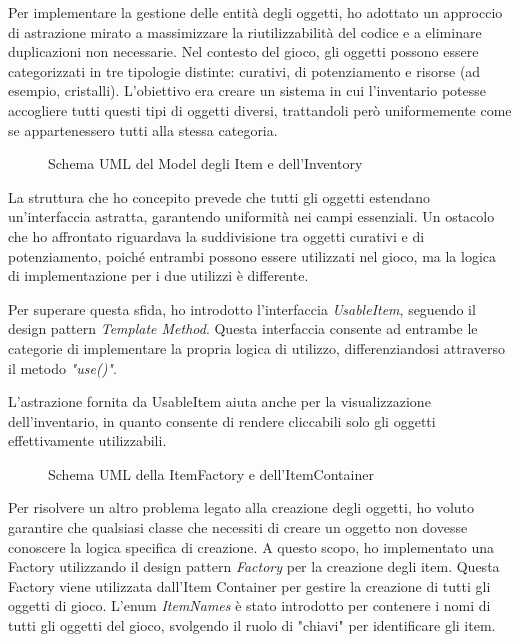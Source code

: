 \documentclass[a4paper,12pt]{report}
\begin{document}
Per implementare la gestione delle entità degli oggetti, ho adottato un approccio di astrazione mirato a massimizzare la riutilizzabilità del codice e a eliminare duplicazioni non necessarie. Nel contesto del gioco, gli oggetti possono essere categorizzati in tre tipologie distinte: curativi, di potenziamento e risorse (ad esempio, cristalli).
L'obiettivo era creare un sistema in cui l'inventario potesse accogliere tutti questi tipi di oggetti diversi, trattandoli però uniformemente come se appartenessero tutti alla stessa categoria.
\begin{figure}[H]
	\centering
	
	\caption{Schema UML del Model degli Item e dell'Inventory}
	\label{fig:the-exiled-item-uml}
\end{figure}

La struttura che ho concepito prevede che tutti gli oggetti estendano un'interfaccia astratta, garantendo uniformità nei campi essenziali. Un ostacolo che ho affrontato riguardava la suddivisione tra oggetti curativi e di potenziamento, poiché entrambi possono essere utilizzati nel gioco, ma la logica di implementazione per i due utilizzi è differente.

Per superare questa sfida, ho introdotto l'interfaccia \textit{UsableItem}, seguendo il design pattern \textit{Template Method}. Questa interfaccia consente ad entrambe le categorie di implementare la propria logica di utilizzo, differenziandosi attraverso il metodo \textit{"use()"}.

L'astrazione fornita da UsableItem aiuta anche per la visualizzazione dell'inventario, in quanto consente di rendere cliccabili solo gli oggetti effettivamente utilizzabili.

\begin{figure}[H]
	\centering
	
	\caption{Schema UML della ItemFactory e dell'ItemContainer}
	\label{fig:the-exiled-itemFactory_itemContainer-uml}
\end{figure}

Per risolvere un altro problema legato alla creazione degli oggetti, ho voluto garantire che qualsiasi classe che necessiti di creare un oggetto non dovesse conoscere la logica specifica di creazione. A questo scopo, ho implementato una Factory utilizzando il design pattern \textit{Factory} per la creazione degli item. Questa Factory viene utilizzata dall'Item Container per gestire la creazione di tutti gli oggetti di gioco. L'enum \textit{ItemNames} è stato introdotto per contenere i nomi di tutti gli oggetti del gioco, svolgendo il ruolo di "chiavi" per identificare gli item.
\end{document}
